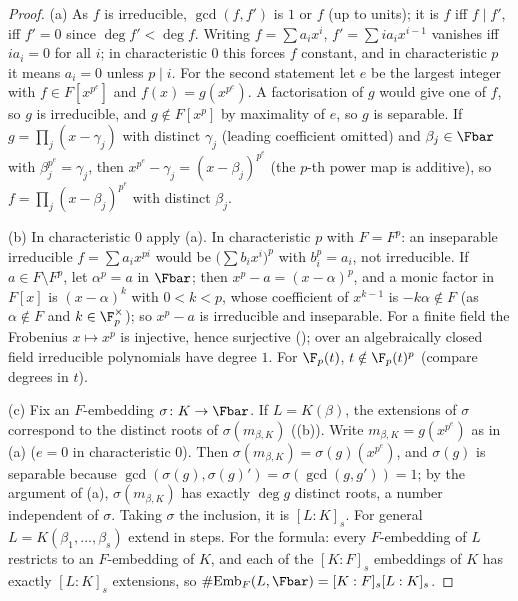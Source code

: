 \begin{proof}
(a) As $f$ is irreducible, $\gcd(f,f')$ is $1$ or $f$ (up to units); it is $f$ iff $f\mid f'$, iff $f'=0$ since $\deg f'<\deg f$. Writing
$f=\sum a_ix^i$, $f'=\sum ia_ix^{i-1}$ vanishes iff $ia_i=0$ for all $i$; in characteristic $0$ this forces $f$ constant, and in characteristic $p$ it
means $a_i=0$ unless $p\mid i$. For the second statement let $e$ be the largest integer with $f\in F[x^{p^e}]$ and $f(x)=g(x^{p^e})$. A factorisation of $g$
would give one of $f$, so $g$ is irreducible, and $g\notin F[x^p]$ by maximality of $e$, so $g$ is separable. If $g=\prod_j(x-\gamma_j)$ with distinct $\gamma_j$
(leading coefficient omitted) and $\beta_j\in\Fbar$ with $\beta_j^{p^e}=\gamma_j$, then $x^{p^e}-\gamma_j=(x-\beta_j)^{p^e}$ (the $p$-th power map is additive), so
$f=\prod_j(x-\beta_j)^{p^e}$ with distinct $\beta_j$.

(b) In characteristic $0$ apply (a). In characteristic $p$ with $F=F^p$: an inseparable irreducible $f=\sum a_ix^{pi}$ would be $\bigl(\sum b_ix^i\bigr)^p$ with
$b_i^p=a_i$, not irreducible. If $a\in F\setminus F^p$, let $\alpha^p=a$ in $\Fbar$; then $x^p-a=(x-\alpha)^p$, and a monic factor in $F[x]$ is $(x-\alpha)^k$
with $0<k<p$, whose coefficient of $x^{k-1}$ is $-k\alpha\notin F$ (as $\alpha\notin F$ and $k\in\F_p^\times$); so $x^p-a$ is irreducible and inseparable. For a
finite field the Frobenius $x\mapsto x^p$ is injective, hence surjective (); over an algebraically closed field irreducible polynomials have
degree $1$. For $\F_p(t)$, $t\notin\F_p(t)^p$ (compare degrees in $t$).

(c) Fix an $F$-embedding $\sigma\colon K\to\Fbar$. If $L=K(\beta)$, the extensions of $\sigma$ correspond to the distinct roots of $\sigma(m_{\beta,K})$
((b)). Write $m_{\beta,K}=g(x^{p^e})$ as in (a) ($e=0$ in characteristic $0$). Then $\sigma(m_{\beta,K})=
\sigma(g)(x^{p^e})$, and $\sigma(g)$ is separable because $\gcd(\sigma(g),\sigma(g)')=\sigma(\gcd(g,g'))=1$; by the argument of (a), $\sigma(m_{\beta,K})$
has exactly $\deg g$ distinct roots, a number independent of $\sigma$. Taking $\sigma$ the inclusion, it is $[L:K]_s$. For general $L=K(\beta_1,\dots,\beta_s)$
extend in steps. For the formula: every $F$-embedding of $L$ restricts to an $F$-embedding of $K$, and each of the $[K:F]_s$ embeddings of $K$ has exactly
$[L:K]_s$ extensions, so $\#\mathrm{Emb}_F(L,\Fbar)=[K:F]_s[L:K]_s$.


\end{proof}
